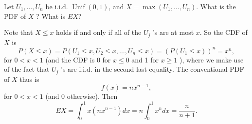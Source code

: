 

\setcounter{theorem}{13}
\begin{exercise}[BH.5.14] Let $U_1, \ldots, U_n$ be i.i.d. $\operatorname{Unif}(0,1)$, and $X=\max \left(U_1, \ldots, U_n\right)$. What is the PDF of $X$ ? What is $E X$?
\begin{solution}
    Note that $X \leq x$ holds if and only if all of the $U_j$ 's are at most $x$. So the CDF of $X$ is
		$$
		P(X \leq x)=P\left(U_1 \leq x, U_2 \leq x, \ldots, U_n \leq x\right)=\left(P\left(U_1 \leq x\right)\right)^n=x^n,
		$$
		for $0<x<1$ (and the CDF is 0 for $x \leq 0$ and 1 for $x \geq 1$ ), where we make use of the fact that $U_j$ 's are i.i.d. in the second last equality. The conventional PDF of $X$ thus is
		$$
		f(x)=n x^{n-1},
		$$
		for $0<x<1$ (and 0 otherwise). Then
		$$
		E X=\int_0^1 x\left(n x^{n-1}\right) d x=n \int_0^1 x^n d x=\frac{n}{n+1} .
		$$ 
\end{solution}
\end{exercise}


